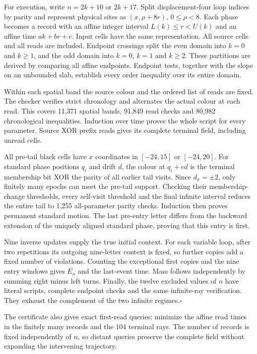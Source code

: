 For execution, write $n=2k+10$ or $2k+17$. Split displacement-four loop
indices by parity and represent physical sites as $(x,\rho+8r)$,
$0\le\rho<8$. Each phase becomes a record with an affine integer interval
$L(k)\le r<U(k)$ and an affine time $ak+br+c$. Input cells have the same
representation. All source cells and all reads are included. Endpoint
crossings split the even domain into $k=0$ and $k\ge1$, and the odd domain
into $k=0$, $k=1$ and $k\ge2$. These partitions are derived by comparing
all affine endpoints. Endpoint tests, together with the slope on an unbounded
slab, establish every order inequality over its entire domain.

Within each spatial band the source colour and the ordered list of reads
are fixed. The checker verifies strict chronology and alternates the actual
colour at each read. This covers 11,371 spatial bands, 91,849 read checks
and 80,982 chronological inequalities. Induction over time proves the whole
script for every parameter. Source XOR prefix reads gives its complete
terminal field, including unread cells.

All pre-tail black cells have $x$ coordinates in $[-24,15]$ or $[-24,20]$.
For standard phase positions $q_i$ and drift $d$, the colour at $q_i+ed$
is the terminal membership bit XOR the parity of all earlier tail visits.
Since $d_x=\pm2$, only finitely many epochs can meet the pre-tail support.
Checking their membership-change thresholds, every self-visit threshold and
the final infinite interval reduces the entire tail to 1,255 all-parameter
parity checks. Induction then proves permanent standard motion. The last
pre-entry letter differs from the backward extension of the uniquely aligned
standard phase, proving that this entry is first.

Nine inverse updates supply the true initial context. For each variable loop,
after two repetitions its outgoing nine-letter context is fixed, so further
copies add a fixed number of violations. Counting the exceptional first
copies and the nine entry windows gives $E_n$ and the last-event time.
Mass follows independently by summing right minus left turns. Finally, the
twelve excluded values of $n$ have literal scripts, complete endpoint checks
and the same infinite-ray verification. They exhaust the complement of the
two infinite regimes.\hfill$\square$

The certificate also gives exact first-read queries: minimize the affine
read times in the finitely many records and the 104 terminal rays. The number
of records is fixed independently of $n$, so distant queries preserve the
complete field without expanding the intervening trajectory.
